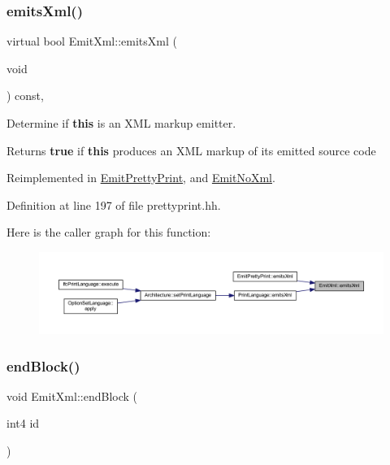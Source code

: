 \subsubsection{\texorpdfstring{emitsXml()}{emitsXml()}}
{\footnotesize\ttfamily virtual bool Emit\+Xml\+::emits\+Xml (\begin{DoxyParamCaption}\item[{void}]{ }\end{DoxyParamCaption}) const\hspace{0.3cm}{\ttfamily [inline]}, {\ttfamily [virtual]}}



Determine if {\bfseries{this}} is an X\+ML markup emitter. 

\begin{DoxyReturn}{Returns}
{\bfseries{true}} if {\bfseries{this}} produces an X\+ML markup of its emitted source code 
\end{DoxyReturn}


Reimplemented in \mbox{\hyperlink{class_emit_pretty_print_a03f3c3650dc9ff7e4d472285d82569ee}{Emit\+Pretty\+Print}}, and \mbox{\hyperlink{class_emit_no_xml_a9344bd2b72587387d09737738b5fe05f}{Emit\+No\+Xml}}.



Definition at line 197 of file prettyprint.\+hh.

Here is the caller graph for this function\+:
\nopagebreak
\begin{figure}[H]
\begin{center}
\leavevmode
\includegraphics[width=350pt]{class_emit_xml_ad73a5d828fc7cd70f1e9ec1e6afad1fa_icgraph}
\end{center}
\end{figure}
\mbox{\label{class_emit_xml_a935b2c6ff63356ee30fa050c2b301bde}} 
\subsubsection{\texorpdfstring{endBlock()}{endBlock()}}
{\footnotesize\ttfamily void Emit\+Xml\+::end\+Block (\begin{DoxyParamCaption}\item[{int4}]{id }\end{DoxyParamCaption})\hspace{0.3cm}{\ttfamily [virtual]}}



